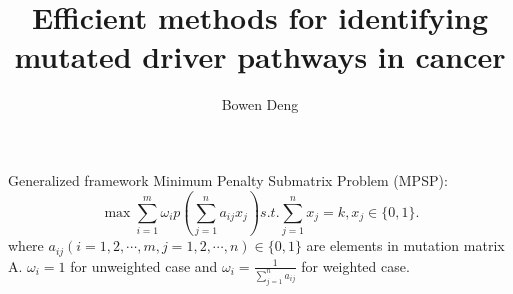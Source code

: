 \documentclass[xcolor=dvipsnames]{beamer}
\begin{document}
\title{Efficient methods for identifying mutated driver pathways in cancer}
\author{Bowen Deng}
\date{}
\begin{frame}
\maketitle
\end{frame}
\begin{frame}{Generalized framework}
Minimum Penalty Submatrix Problem (MPSP):
\[
\max\sum_{i=1}^m \omega_i p(\sum_{j=1}^n a_{ij}x_j) s.t. \sum_{j=1}^nx_j=k,x_j\in\{0,1\}.
\]
where $a_{ij}(i=1,2,\cdots,m,j=1,2,\cdots,n)\in \{0,1\}$ are elements in mutation matrix A. $\omega_i=1$ for unweighted case and $\omega_i=\frac{1}{\sum_{j=1}^na_{ij}}$ for weighted case.\\
\end{frame}
\end{document}
